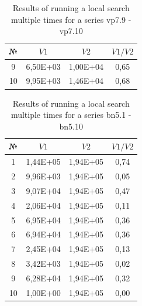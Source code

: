 \documentclass{ifacconf}
\begin{document}
\begin{table}[ht]
	\centering
	\begin{tabular}{|c|c|c|c|}
		\hline
		\hspace*{1.5mm}№\hspace*{0.1mm} &
		\hspace*{1.5cm}$V1$\hspace*{0.1cm}&
		\hspace*{1.5cm}$V2$\hspace*{0.1cm}&
		\hspace*{0.5cm}$V1/V2$\hspace*{0.5cm}\\
		\hline
		9  & 6,50E+03  &  1,00E+04  &  0,65\\
		10 & 9,95E+03  &  1,46E+04  &  0,68\\
		\hline
	\end{tabular}
	\caption{Results of running a local search multiple times for a series vp7.9 - vp7.10}	\label{spher_vp7}
\end{table}
\begin{table}[h!]
	\vspace{1cm}
	\centering
	\begin{tabular}{|c|c|c|c|}
		\hline
		\hspace*{1.5mm}№\hspace*{1.5mm} &
		\hspace*{1.5cm}$V1$\hspace*{1.5cm}&
		\hspace*{1.5cm}$V2$\hspace*{1.5cm}&
		\hspace*{0.5cm}$V1/V2$\hspace*{0.5cm}\\
		\hline
		1 &  1,44E+05  &  1,94E+05  &  0,74\\
		2 &  9,96E+03  &  1,94E+05  &  0,05\\
		3 &  9,07E+04  &  1,94E+05  &  0,47\\
		4 &  2,06E+04  &  1,94E+05  &  0,11\\
		5 &  6,95E+04  &  1,94E+05  &  0,36\\
		6 &  6,94E+04  &  1,94E+05  &  0,36\\
		7 &  2,45E+04  &  1,94E+05  &  0,13\\
		8 &  3,42E+03  &  1,94E+05  &  0,02\\
		9 &  6,28E+04  &  1,94E+05  &  0,32\\
		10&  1,00E+00  &  1,94E+05  &  0,00\\
		\hline
	\end{tabular}
	\vspace{1em}
	\caption{Results of running a local search multiple times for a series bn5.1 - bn5.10}	\label{spher_bn}
\end{table}
\end{document}
